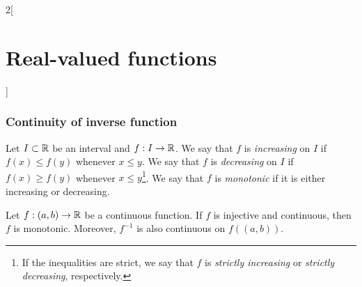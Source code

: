 \documentclass[../../../main.tex]{subfiles}
\begin{document}
\begin{multicols}{2}[\section{Real-valued functions}]
  \subsubsection{Continuity of inverse function}
  \begin{definition}
    Let $I\subset\mathbb{R}$ be an interval and $f:I\rightarrow\mathbb{R}$. We say that $f$ is \emph{increasing} on $I$ if $f(x)\leq f(y)$ whenever $x\leq y$. We say that $f$ is \emph{decreasing} on $I$ if $f(x)\geq f(y)$ whenever $x\leq y$\footnote{If the inequalities are strict, we say that $f$ is \emph{strictly increasing} or \emph{strictly decreasing}, respectively.}. We say that $f$ is \emph{monotonic} if it is either increasing or decreasing.
  \end{definition}
  \begin{theorem}
    Let $f:(a,b)\rightarrow\mathbb{R}$ be a continuous function. If $f$ is injective and continuous, then $f$ is monotonic. Moreover, $f^{-1}$ is also continuous on $f((a,b))$.
  \end{theorem}

\end{multicols}
\end{document}
